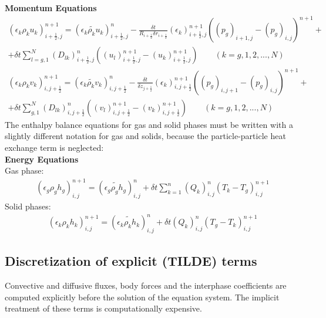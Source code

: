 {\bf Momentum Equations}\\
%
\begin{eqnarray}
(\epsilon_k \rho_k u_k)_{i+\frac{1}{2},j}^{n+1} =
(\widetilde{\epsilon_k \rho_k u_k})_{i+\frac{1}{2},j}^{n} -
\frac{\delta t}{R_{i+\frac{1}{2}}\delta r_{i+\frac{1}{2}}} 
(\epsilon_k)_{i+\frac{1}{2},j}^{n+1}
((p_g)_{i+1,j} - (p_g)_{i,j})^{n+1} + \nonumber \\
+\delta t \sum_{l=g,1}^{N} (D_{lk})^n_{i+\frac{1}{2},j}
((u_l)_{i+\frac{1}{2},j}^{n+1} - (u_k)_{i+\frac{1}{2},j}^{n+1})
\qquad (k=g,1,2,...,N)
\nonumber
\end{eqnarray}
%
\begin{eqnarray}
(\epsilon_k \rho_k v_k)_{i,j+\frac{1}{2}}^{n+1} =
(\widetilde{\epsilon_k \rho_k v_k})_{i,j+\frac{1}{2}}^{n} -
\frac{\delta t}{\delta z_{j+\frac{1}{2}}} (\epsilon_k)_{i,j+\frac{1}{2}}^{n+1}
((p_g)_{i,j+1} - (p_g)_{i,j})^{n+1} + \nonumber \\
+ \delta t \sum_{g,1}^{N} (D_{lk})^n_{i,j+\frac{1}{2}}
((v_l)_{i,j+\frac{1}{2}}^{n+1} - (v_k)_{i,j+\frac{1}{2}}^{n+1})
\qquad (k=g,1,2,...,N)
\nonumber
\end{eqnarray}
%
The enthalpy balance equations for gas and solid phases must be written with a 
slightly different notation for gas and solids, because the particle-particle
heat exchange term is neglected:\\

{\bf Energy Equations}\\
%
Gas phase:
%
\begin{eqnarray}
(\epsilon_g \rho_g h_g)_{i,j}^{n+1} = 
(\widetilde{\epsilon_g \rho_g h_g})^n_{i,j} +
\delta t \sum_{k=1}^{n} (Q_{k})_{i,j}^{n} (T_k - T_g)_{i,j}^{n+1}
\nonumber
\end{eqnarray}
%
Solid phases:
%
\begin{eqnarray}
(\epsilon_k \rho_k h_k)_{i,j}^{n+1} = 
(\widetilde{\epsilon_k \rho_k h_k})^n_{i,j} +
\delta t  (Q_{k})_{i,j}^{n} (T_g - T_k)_{i,j}^{n+1}
\nonumber
\end{eqnarray}
%
\newpage
%
\subsection{Discretization of  explicit (TILDE) terms}
Convective and diffusive fluxes, body forces and the interphase coefficients
are computed explicitly before the solution of the equation system. 
The implicit treatment of these terms is computationally expensive.\\

